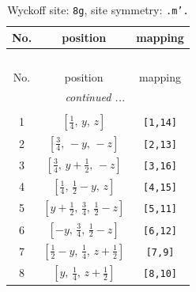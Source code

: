 \documentclass[fleqn,8pt]{jsarticle}
\begin{document}
\begin{longtable}{ccc}
\caption{Wyckoff site: {\tt 8g}, site symmetry: {\tt .m'.}}
 \\
 \hline \hline
No. & position & mapping \\ \hline \endfirsthead

\multicolumn{2}{l}{\tablename\ \thetable{}} \\
 \hline \hline
No. & position & mapping \\ \hline \endhead

 \hline \hline
\multicolumn{2}{r}{\footnotesize\it continued ...} \\ \endfoot

 \hline \hline
\multicolumn{2}{r}{} \\ \endlastfoot

1 & $\left[ \frac{1}{4},\, y,\, z \right]$ & {\tt [1,14]} \\ \hline
2 & $\left[ \frac{3}{4},\, - y,\, - z \right]$ & {\tt [2,13]} \\ \hline
3 & $\left[ \frac{3}{4},\, y + \frac{1}{2},\, - z \right]$ & {\tt [3,16]} \\ \hline
4 & $\left[ \frac{1}{4},\, \frac{1}{2} - y,\, z \right]$ & {\tt [4,15]} \\ \hline
5 & $\left[ y + \frac{1}{2},\, \frac{3}{4},\, \frac{1}{2} - z \right]$ & {\tt [5,11]} \\ \hline
6 & $\left[ - y,\, \frac{3}{4},\, \frac{1}{2} - z \right]$ & {\tt [6,12]} \\ \hline
7 & $\left[ \frac{1}{2} - y,\, \frac{1}{4},\, z + \frac{1}{2} \right]$ & {\tt [7,9]} \\ \hline
8 & $\left[ y,\, \frac{1}{4},\, z + \frac{1}{2} \right]$ & {\tt [8,10]} \\
\end{longtable}
\renewcommand{\arraystretch}{1.2}
\end{document}
